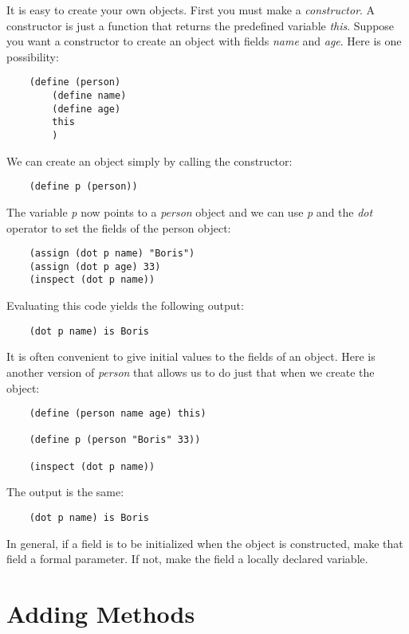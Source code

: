 It is easy to create your own objects. First you must make a
{\it constructor}. A constructor is just a function that returns 
the predefined variable {\it this}. Suppose you want a constructor to
create an object with fields {\it name} and {\it age}. Here is 
one possibility:

\begin{verbatim}
    (define (person)
        (define name)
        (define age)
        this
        )
\end{verbatim}

We can create an object simply by calling the constructor:

\begin{verbatim}
    (define p (person))
\end{verbatim}

The variable {\it p} now points to a {\it person} object and we
can use {\it p} and the {\it dot} operator to
set the fields of the person object:

\begin{verbatim}
    (assign (dot p name) "Boris")
    (assign (dot p age) 33)
    (inspect (dot p name))
\end{verbatim}

Evaluating this code yields the following output:

\begin{verbatim}
    (dot p name) is Boris
\end{verbatim}

It is often convenient to give initial values to the fields of
an object. Here is another version of {\it person} that allows us
to do just that when we create the object:

\begin{verbatim}
    (define (person name age) this)
        
    (define p (person "Boris" 33))
        
    (inspect (dot p name))
\end{verbatim}

The output is the same:

\begin{verbatim}
    (dot p name) is Boris
\end{verbatim}

In general, if a field is to be initialized when the object
is constructed, make that field a formal parameter. If not,
make the field a locally declared variable.

\section{Adding Methods}

